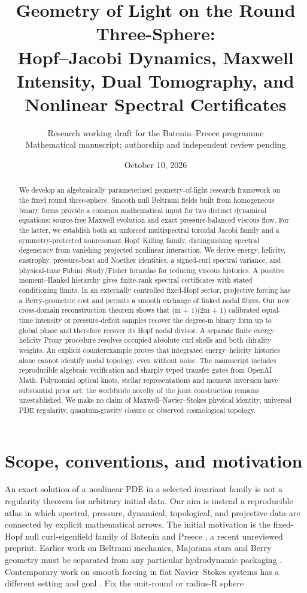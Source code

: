 \documentclass[10pt,letterpaper]{article}
\title{Geometry of Light on the Round Three-Sphere:\\[3pt]\large Hopf--Jacobi Dynamics, Maxwell Intensity, Dual Tomography, and Nonlinear Spectral Certificates}
\author{Research working draft for the Batenin--Preece programme\\\small Mathematical manuscript; authorship and independent review pending}
\date{October 10, 2026}
\theoremstyle{remark}
\begin{document}
\maketitle
\begin{abstract}

We develop an algebraically parameterized geometry-of-light research framework on the fixed round three-sphere. Smooth null Beltrami fields built from homogeneous binary forms provide a common mathematical input for two distinct dynamical equations: source-free Maxwell evolution and exact pressure-balanced viscous flow. For the latter, we establish both an unforced multispectral toroidal Jacobi family and a symmetry-protected nonresonant Hopf–Killing family, distinguishing spectral degeneracy from vanishing projected nonlinear interaction. We derive energy, helicity, enstrophy, pressure-beat and Noether identities, a signed-curl spectral variance, and physical-time Fubini–Study/Fisher formulas for reducing viscous histories. A positive moment–Hankel hierarchy gives finite-rank spectral certificates with stated conditioning limits. In an externally controlled fixed-Hopf sector, projective forcing has a Berry-geometric cost and permits a smooth exchange of linked nodal fibres. Our new cross-domain reconstruction theorem shows that (m + 1)(2m + 1) calibrated equal-time intensity or pressure-deficit samples recover the degree-m binary form up to global phase and therefore recover its Hopf nodal divisor. A separate finite energy–helicity Prony procedure resolves occupied absolute curl shells and both chirality weights. An explicit counterexample proves that integrated energy–helicity histories alone cannot identify nodal topology, even without noise. The manuscript includes reproducible algebraic verification and sharply typed transfer gates from OpenAI Math. Polynomial optical knots, stellar representations and moment inversion have substantial prior art; the worldwide novelty of the joint construction remains unestablished. We make no claim of Maxwell–Navier–Stokes physical identity, universal PDE regularity, quantum-gravity closure or observed cosmological topology.

\end{abstract}

\section{Scope, conventions, and motivation}

An exact solution of a nonlinear PDE in a selected invariant family is not a regularity theorem for arbitrary initial data. Our aim is instead a reproducible atlas in which spectral, pressure, dynamical, topological, and projective data are connected by explicit mathematical arrows. The initial motivation is the fixed-Hopf null curl-eigenfield family of Batenin and Preece \cite{ref4}, a recent unreviewed preprint. Earlier work on Beltrami mechanics, Majorana stars and Berry geometry must be separated from any particular hydrodynamic packaging \cite{ref5,ref6,ref7}. Contemporary work on smooth forcing in flat Navier–Stokes systems has a different setting and goal \cite{ref10}. Fix the unit-round or radius-R sphere
\end{document}
